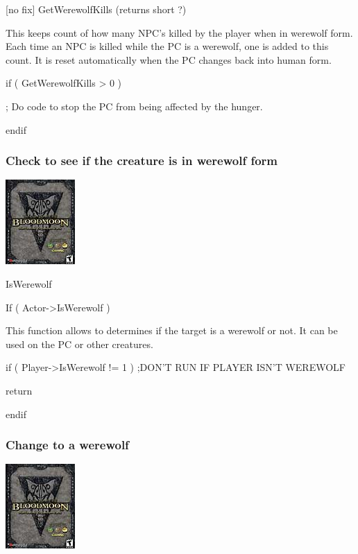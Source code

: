 {[}no fix{]} GetWerewolfKills (returns short ?)

This keeps count of how many NPC's killed by the player when in werewolf
form. Each time an NPC is killed while the PC is a werewolf, one is
added to this count. It is reset automatically when the PC changes back
into human form.

if ( GetWerewolfKills \textgreater{} 0 )

; Do code to stop the PC from being affected by the hunger.

endif

\hypertarget{check-to-see-if-the-creature-is-in-werewolf-form}{%
\subsubsection{Check to see if the creature is in werewolf
form}\label{check-to-see-if-the-creature-is-in-werewolf-form}}

\includegraphics{media/image7.png}

IsWerewolf

If ( Actor-\textgreater IsWerewolf )

This function allows to determines if the target is a werewolf or not.
It can be used on the PC or other creatures.

if ( Player-\textgreater IsWerewolf != 1 ) ;DON'T RUN IF PLAYER ISN'T
WEREWOLF

return

endif

\hypertarget{change-to-a-werewolf}{%
\subsubsection{Change to a werewolf}\label{change-to-a-werewolf}}

\includegraphics{media/image7.png}

